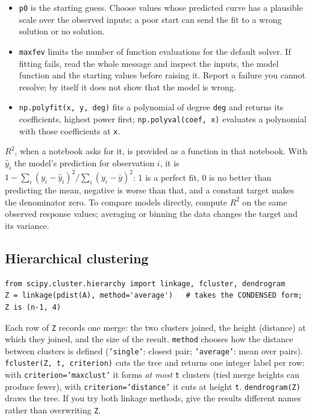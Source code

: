 \documentclass[11pt]{article}
\begin{document}
\begin{itemize}
\item \texttt{p0} is the starting guess. Choose values whose predicted curve has a
      plausible scale over the observed inputs; a poor start can send the fit to a wrong
      solution or no solution.
\item \texttt{maxfev} limits the number of function evaluations for the default solver.
      If fitting fails, read the whole message and inspect the inputs, the model function
      and the starting values before raising it. Report a failure you cannot resolve; by
      itself it does not show that the model is wrong.
\item \texttt{np.polyfit(x, y, deg)} fits a polynomial of degree \texttt{deg} and returns
      its coefficients, highest power first; \texttt{np.polyval(coef, x)} evaluates a
      polynomial with those coefficients at \texttt{x}.
\end{itemize}

$R^2$, when a notebook asks for it, is provided as a function in that notebook. With
$\hat{y}_i$ the model's prediction for observation $i$, it is
$1 - \sum_i (y_i - \hat{y}_i)^2 / \sum_i (y_i - \bar{y})^2$: 1 is a perfect fit, 0 is no
better than predicting the mean, negative is worse than that, and a constant target makes
the denominator zero. To compare models directly, compute $R^2$ on the same observed
response values; averaging or binning the data changes the target and its variance.

\subsection{Hierarchical clustering}

\begin{codebox}
\begin{verbatim}
from scipy.cluster.hierarchy import linkage, fcluster, dendrogram
Z = linkage(pdist(A), method='average')   # takes the CONDENSED form; Z is (n-1, 4)
\end{verbatim}
\end{codebox}

Each row of \texttt{Z} records one merge: the two clusters joined, the height (distance)
at which they joined, and the size of the result. \texttt{method} chooses how the distance
between clusters is defined (\texttt{'single'}: closest pair; \texttt{'average'}: mean
over pairs). \texttt{fcluster(Z, t, criterion)} cuts the tree and returns one integer
label per row: with \texttt{criterion='maxclust'} it forms \emph{at most} \texttt{t}
clusters (tied merge heights can produce fewer), with \texttt{criterion='distance'} it
cuts at height \texttt{t}. \texttt{dendrogram(Z)} draws the tree. If you try both
linkage methods, give the results different names rather than overwriting \texttt{Z}.
\end{document}
